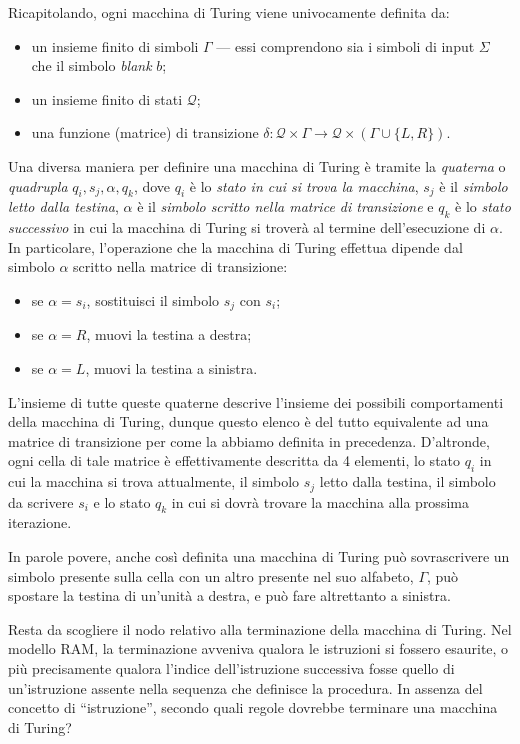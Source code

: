 \documentclass[10pt]{\classname}
\theoremstyle{definition}
\theoremstyle{definition}
\begin{document}
Ricapitolando, ogni macchina di Turing viene univocamente definita da:
\begin{itemize}
    \item un insieme finito di simboli $\Gamma$ --- essi comprendono sia i
        simboli di input $\Sigma$ che il simbolo \emph{blank} $b$;
    \item un insieme finito di stati $\mathcal Q$;
    \item una funzione (matrice) di transizione $\delta  : \mathcal Q \times
        \Gamma \rightarrow \mathcal Q \times (\Gamma \cup \{L,R\})$.
\end{itemize}

Una diversa maniera per definire una macchina di Turing è tramite la
\emph{quaterna} o \emph{quadrupla} $q_i, s_j, \alpha, q_k$, dove $q_i$ è lo
\emph{stato in cui si trova la macchina}, $s_j$ è il \emph{simbolo letto dalla
testina}, $\alpha$ è il \emph{simbolo scritto nella matrice di transizione} e
$q_k$ è lo \emph{stato successivo} in cui la macchina di Turing si troverà al
termine dell'esecuzione di $\alpha$. In particolare, l'operazione che la
macchina di Turing effettua dipende dal simbolo $\alpha$ scritto nella matrice
di transizione:
\begin{itemize}
    \item se $\alpha = s_i$, sostituisci il simbolo $s_j$ con $s_i$;
    \item se $\alpha = R$, muovi la testina a destra;
    \item se $\alpha = L$, muovi la testina a sinistra.
\end{itemize}

L'insieme di tutte queste quaterne descrive l'insieme dei possibili
comportamenti della macchina di Turing, dunque questo elenco è del tutto
equivalente ad una matrice di transizione per come la abbiamo definita in
precedenza. D'altronde, ogni cella di tale matrice è effettivamente descritta da 4 elementi, lo stato $q_i$ in cui la macchina si trova attualmente, il simbolo $s_j$ letto dalla testina, il simbolo da scrivere $s_i$ e lo stato $q_k$ in cui si dovrà trovare la macchina alla prossima iterazione.

In parole povere, anche così definita una macchina di Turing può sovrascrivere
un simbolo presente sulla cella con un altro presente nel suo alfabeto,
$\Gamma$, può spostare la testina di un'unità a destra, e può fare altrettanto
a sinistra.

Resta da scogliere il nodo relativo alla terminazione della macchina di Turing.
Nel modello RAM, la terminazione avveniva qualora le istruzioni si fossero
esaurite, o più precisamente qualora l'indice dell'istruzione successiva fosse
quello di un'istruzione assente nella sequenza che definisce la procedura. In
assenza del concetto di ``istruzione'', secondo quali regole dovrebbe terminare
una macchina di Turing?
\end{document}
